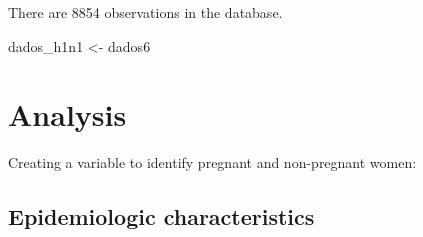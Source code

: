 \documentclass[
]{article}
\newenvironment{Shaded}{\begin{snugshade}}{\end{snugshade}}
\newcommand{\DataTypeTok}[1]{\textcolor[rgb]{0.13,0.29,0.53}{#1}}
\newcommand{\KeywordTok}[1]{\textcolor[rgb]{0.13,0.29,0.53}{\textbf{#1}}}
\newcommand{\NormalTok}[1]{#1}
\newcommand{\OperatorTok}[1]{\textcolor[rgb]{0.81,0.36,0.00}{\textbf{#1}}}
\newcommand{\StringTok}[1]{\textcolor[rgb]{0.31,0.60,0.02}{#1}}
\begin{document}
\begin{Shaded}
\end{Shaded}

There are 8854 observations in the database.

\begin{Shaded}
\begin{Highlighting}[]
\NormalTok{dados_h1n1 <-}\StringTok{  }\NormalTok{dados6}
\end{Highlighting}
\end{Shaded}

\hypertarget{analysis}{%
\section{Analysis}\label{analysis}}

Creating a variable to identify pregnant and non-pregnant women:

\begin{Shaded}
\end{Shaded}

\begin{Shaded}
\end{Shaded}

\hypertarget{epidemiologic-characteristics}{%
\subsection{Epidemiologic
characteristics}\label{epidemiologic-characteristics}}
\end{document}
